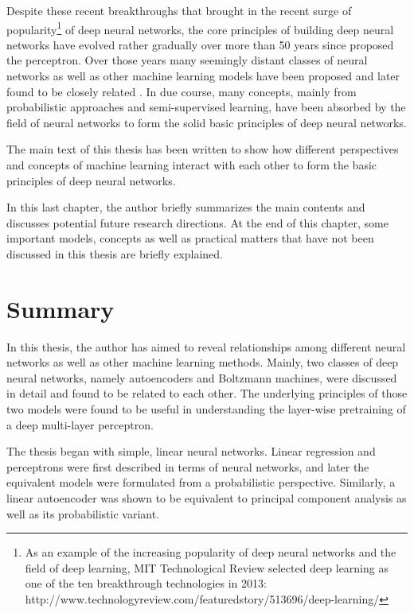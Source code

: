 \documentclass[dissertation,nocontribution,draft*]{aaltoseries}
\begin{document}
Despite these recent breakthroughs that brought in the
recent surge of popularity\footnote{As an example of the
increasing popularity of deep neural networks and the field
of deep learning, MIT Technological Review selected deep
learning as one of the ten breakthrough technologies in
2013:
\\http://www.technologyreview.com/featuredstory/513696/deep-learning/
} of deep neural networks, the core principles of building
deep neural networks have evolved rather gradually over more
than 50 years since \citet{Rosenblatt1958} proposed the
perceptron. Over those years many seemingly distant classes
of neural networks as well as other machine learning models
have been proposed and later found to be closely related
\citep[see, e.g.,][]{Haykin2009}. In due course, many
concepts, mainly from probabilistic approaches and
semi-supervised learning, have been absorbed by the field of
neural networks to form the solid basic principles of deep
neural networks.

The main text of this thesis has been written to show how
different perspectives and concepts of machine learning
interact with each other to form the basic principles of deep
neural networks. 

In this last chapter, the author briefly summarizes the main
contents and discusses potential future
research directions. At the end of this chapter, some
important models, concepts as well as practical matters that
have not been discussed in this thesis are briefly
explained.

\section{Summary}

In this thesis, the author has aimed to reveal relationships
among different neural networks as well as other
machine learning methods. Mainly, two classes of deep neural
networks, namely autoencoders and Boltzmann machines, were
discussed in detail and found to be related to each other.
The underlying principles of those two models were found to
be useful in understanding the layer-wise pretraining of a deep
multi-layer perceptron.

The thesis began with simple, linear neural networks.
Linear regression and perceptrons were first described in
terms of neural networks, and later the equivalent models
were formulated from a probabilistic perspective. Similarly, a
linear autoencoder was shown to be equivalent to principal
component analysis as well as its probabilistic variant.
\end{document}
